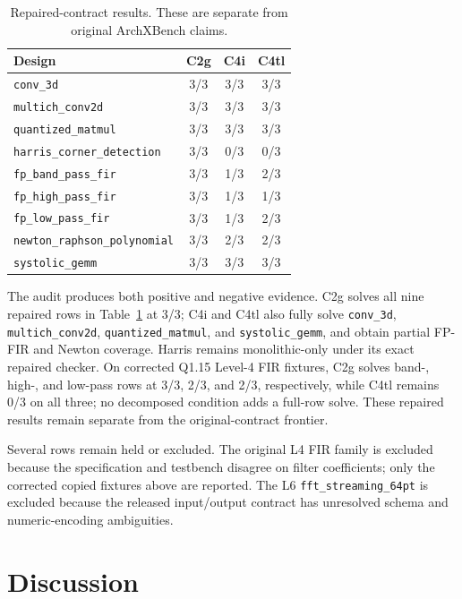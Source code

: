\documentclass[sigconf,anonymous]{acmart}
\newcommand{\arch}{ArchXBench\xspace}
\newcommand{\cTwoG}{C2g\xspace}
\newcommand{\cFourI}{C4i\xspace}
\newcommand{\cFourTL}{C4tl\xspace}
\begin{document}
\begin{table}[!htbp]
\centering
\caption{Repaired-contract results. These are separate from original \arch claims.}
\label{tab:repaired}
\footnotesize
\setlength{\tabcolsep}{4.0pt}
\renewcommand{\arraystretch}{0.92}
\begin{tabular}{lccc}
\toprule
Design & \cTwoG & \cFourI & \cFourTL \\
\midrule
\texttt{conv\_3d} & 3/3 & 3/3 & 3/3 \\
\texttt{multich\_conv2d} & 3/3 & 3/3 & 3/3 \\
\texttt{quantized\_matmul} & 3/3 & 3/3 & 3/3 \\
\texttt{harris\_corner\_detection} & 3/3 & 0/3 & 0/3 \\
\texttt{fp\_band\_pass\_fir} & 3/3 & 1/3 & 2/3 \\
\texttt{fp\_high\_pass\_fir} & 3/3 & 1/3 & 1/3 \\
\texttt{fp\_low\_pass\_fir} & 3/3 & 1/3 & 2/3 \\
\texttt{newton\_raphson\_polynomial} & 3/3 & 2/3 & 2/3 \\
\texttt{systolic\_gemm} & 3/3 & 3/3 & 3/3 \\
\bottomrule
\end{tabular}
\renewcommand{\arraystretch}{1.0}
\end{table}

The audit produces both positive and negative evidence.
\cTwoG solves all nine repaired rows in Table~\ref{tab:repaired} at 3/3; \cFourI and \cFourTL also fully solve \texttt{conv\_3d}, \texttt{multich\_conv2d}, \texttt{quantized\_matmul}, and \texttt{systolic\_gemm}, and obtain partial FP-FIR and Newton coverage.
Harris remains monolithic-only under its exact repaired checker.
On corrected Q1.15 Level-4 FIR fixtures, \cTwoG solves band-, high-, and low-pass rows at 3/3, 2/3, and 2/3, respectively, while \cFourTL remains 0/3 on all three; no decomposed condition adds a full-row solve.
These repaired results remain separate from the original-contract frontier.

Several rows remain held or excluded.
The original L4 FIR family is excluded because the specification and testbench disagree on filter coefficients; only the corrected copied fixtures above are reported.
The L6 \texttt{fft\_streaming\_64pt} is excluded because the released input/output contract has unresolved schema and numeric-encoding ambiguities.

\section{Discussion}
\end{document}
